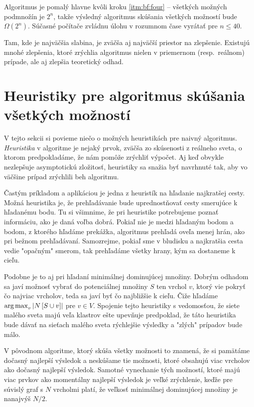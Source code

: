 Algoritmus je pomalý hlavne kvôli kroku \ref{itm:bf:four} -- všetkých možných 
podmnožín je $2^n$, takže výsledný algoritmus skúšania všetkých možností bude 
$\Omega (2^n)$. Súčasné počítače zvládnu úlohu v rozumnom čase vyrátať pre 
$n\le 40$.

Tam, kde je najväčšia slabina, je zväčša aj najväčší priestor na zlepšenie. 
Existujú mnohé zlepšenia, ktoré zrýchlia algoritmus nielen v priemernom 
(resp.~reálnom) prípade, ale aj zlepšia teoretický odhad.

\section{Heuristiky pre algoritmus skúšania všetkých možností}

V tejto sekcii si povieme niečo o možných heuristikách pre naivný algoritmus. 
\emph{Heuristika} v algoritme je nejaký prvok, zväčša zo skúsenosti z reálneho 
sveta, o ktorom predpokladáme, že nám pomôže zrýchliť výpočet. Aj keď obvykle 
nezlepšuje asymptotickú zložitosť, heuristiky sa snažia byť navrhnuté tak, aby 
vo väčšine prípad zrýchlili beh algoritmu.

Častým príkladom a aplikáciou je jedna z heuristík na hľadanie najkratšej 
cesty. Možná heuristika je, že prehľadávanie bude uprednostňovať cesty 
smerujúce k hľadanému bodu. Tu si všimnime, že pri heuristike potrebujeme 
poznať informáciu, ako je daná voľba dobrá. Pokiaľ nie je medzi hľadaným bodom 
a bodom, z ktorého hľadáme prekážka, algoritmus prehľadá oveľa menej hrán, 
ako pri bežnom prehľadávaní. Samozrejme, pokiaľ sme v bludisku a najkratšia 
cesta vedie "opačným" smerom, tak prehľadáme všetky hrany, kým sa dostaneme k 
cieľu.

Podobne je to aj pri hľadaní minimálnej dominujúcej množiny. Dobrým odhadom sa 
javí možnosť vybrať do potenciálnej množiny $S$ ten vrchol $v$, ktorý vie 
pokryť čo najviac vrcholov, teda sa javí byť čo najbližšie k cieľu. Čiže hľadáme 
$\operatorname*{arg\,max}_v \left|N\left[S \cup {v}\right]\right|$ pre $v \in V$. Spojenie 
tejto heuristiky s vedomosťou, že siete malého sveta majú veľa klastrov ešte 
upevňuje predpoklad, že táto heuristika bude dávať na sieťach malého sveta 
rýchlejšie výsledky a "zlých" prípadov bude málo.

V pôvodnom algoritme, ktorý skúša všetky možnosti to znamená, že si pamätáme 
dočasný najlepší výsledok a neskúšame tie možnosti, ktoré obsahujú viac vrcholov 
ako dočasný najlepší výsledok. Samotné vynechanie tých možností, ktoré majú viac 
prvkov ako momentálny najlepší výsledok je veľké zrýchlenie, keďže pre súvislý 
graf s $N$ vrcholmi platí, že veľkosť minimálnej dominujúcej množiny je nanajvýš 
${N}\!/{2}$.

